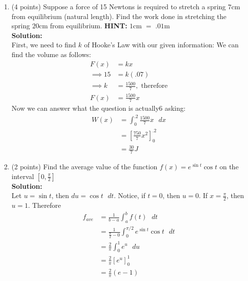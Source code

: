 \documentclass[paper=a4, fontsize=11pt]{scrartcl} %
\numberwithin{equation}{section} %
\numberwithin{figure}{section} %
\numberwithin{table}{section} %
\begin{document}
\begin{enumerate}
\item (4 points) Suppose a force of 15 Newtons is required to stretch a spring $7$cm from equilibrium (natural length).  Find the work done in stretching the spring $20$cm from equilibrium. \textbf{HINT:} $1$cm $=$ $.01$m \\
\noindent\textbf{Solution:}\\
First, we need to find $k$ of Hooke's Law with our given information:
We can find the volume as follows:
\begin{align*}
F(x) &=k x \\
\implies 15 &=k (.07)\\
\implies k &= \frac{1500}{7}, \text { therefore}\\
 F(x) &= \frac{1500}{7} x
\end{align*}
Now we can answer what the question is actually6 asking:
\begin{align*}
W(x) &= \int_0^{.2} \frac{1500}{7} x  \text{  } dx \\
&=\left[ \frac{750}{7} x^2 \right]_0^{.2} \\
&= \boxed{\frac{30}{7} J}
\end{align*}

\item (2 points) Find the average value of the function $f(x)=e^{\sin t} \cos t$ on the interval $[0,\frac{\pi}{2}]$\\
\noindent\textbf{Solution:}\\
Let $u=\sin t$, then $du=\cos t \text { } dt$.  Notice, if $t=0$, then $u=0$.  If $x=\frac{\pi}{2}$, then $u=1$.  Therefore
\begin{align*}
f_{ave} &= \frac{1}{b-a}\int_a^b f(t)\text { }  dt\\
&= \frac{1}{\frac{\pi}{2}-0}\int_0^{\pi/2} e^{\sin t} \cos t\text { }  dt\\
&= \frac{2}{\pi} \int_0^{1} e^u\text { }  du\\
&= \frac{2}{\pi} \left[ e^u \right] _0^{1} \\
&= \boxed{\frac{2}{\pi} (e-1)}  
\end{align*}


\end{enumerate}

\end{document}

